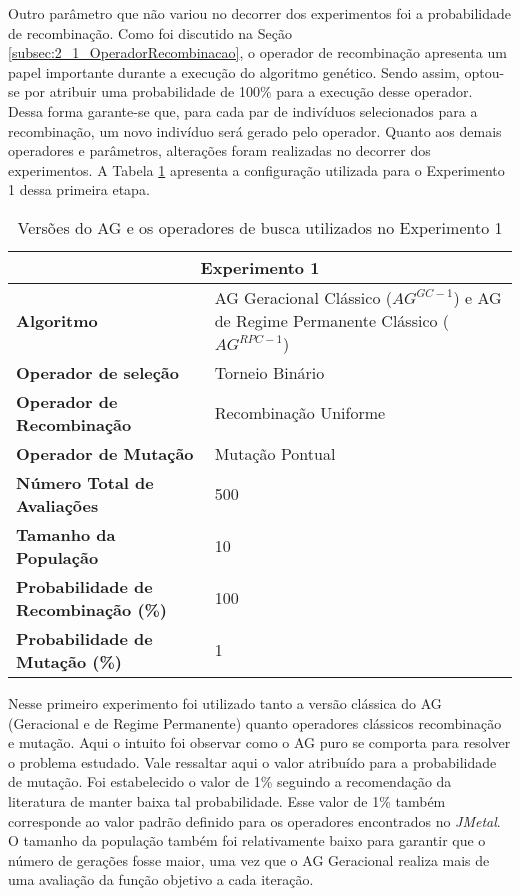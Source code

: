 Outro parâmetro que não variou no decorrer dos experimentos foi a probabilidade de recombinação. Como foi discutido na Seção \ref{subsec:2_1_OperadorRecombinacao}, o operador de recombinação apresenta um papel importante durante a execução do algoritmo genético. Sendo assim, optou-se por atribuir uma probabilidade de 100\% para a execução desse operador. Dessa forma garante-se que, para cada par de indivíduos selecionados para a recombinação, um novo indivíduo será gerado pelo operador. Quanto aos demais operadores e parâmetros, alterações foram realizadas no decorrer dos experimentos. A Tabela \ref{table:con01} apresenta a configuração utilizada para o Experimento 1 dessa primeira etapa.

\begin{table}[!htbp]
\centering
\caption{Versões do AG e os operadores de busca utilizados no Experimento 1}
\label{table:con01}
\begin{tabular}{|p{6cm}|p{9cm}|}
\hline
\multicolumn{2}{|c|}{\textbf{Experimento 1}} \\ \hline
{\textbf{Algoritmo}} & AG Geracional Clássico ($AG^{GC-1}$) e AG de Regime Permanente Clássico ($AG^{RPC-1}$) \\ \hline
\textbf{Operador de seleção} & Torneio Binário \\ \hline
\textbf{Operador de Recombinação} & Recombinação Uniforme \\  \hline
\textbf{Operador de Mutação} & Mutação Pontual \\ \hline
\textbf{Número Total de Avaliações} & 500 \\ \hline
\textbf{Tamanho da População} & 10 \\ \hline
\textbf{Probabilidade de Recombinação (\%)} & 100 \\ \hline
\textbf{Probabilidade de Mutação (\%)} & 1 \\ \hline
\end{tabular}
\end{table}

Nesse primeiro experimento foi utilizado tanto a versão clássica do AG (Geracional e de Regime Permanente) quanto operadores clássicos recombinação e mutação. Aqui o intuito foi observar como o AG puro se comporta para resolver o problema estudado. Vale ressaltar aqui o valor atribuído para a probabilidade  de mutação. Foi estabelecido o valor de 1\% seguindo a recomendação da literatura de manter baixa tal probabilidade. Esse valor de 1\% também corresponde ao valor padrão definido para os operadores encontrados no \textit{JMetal}. O tamanho da população também foi relativamente baixo para garantir que o número de gerações fosse maior, uma vez que o AG Geracional realiza mais de uma avaliação da função objetivo a cada iteração.

